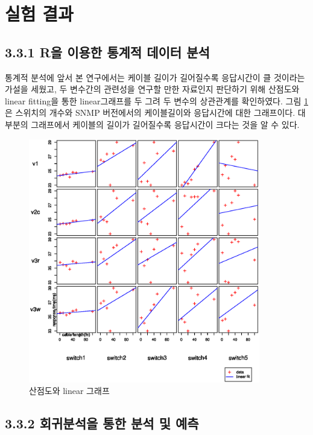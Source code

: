 \documentclass[11pt
  , a4paper
  , article
  , oneside
]{memoir}
\begin{document}
\clearpage
\section{실험 결과}
\subsection{3.3.1 R을 이용한 통계적 데이터 분석}

통계적 분석에 앞서 본 연구에서는 케이블 길이가 길어질수록 응답시간이 클 것이라는 가설을 세웠고, 두 변수간의 관련성을 연구할 만한 자료인지 판단하기 위해 산점도와 linear fitting을 통한 linear그래프를 두 그려 두 변수의 상관관계를 확인하였다. 그림 \ref{fig:linear}은 스위치의 개수와 SNMP 버전에서의 케이블길이와 응답시간에 대한 그래프이다. 대부분의 그래프에서 케이블의 길이가 길어질수록 응답시간이 크다는 것을 알 수 있다.

\begin{figure}[!htb]
  \centering
  \includegraphics[width=0.9\textwidth]{./images/sleep1_switch.eps}
  \caption{산점도와 linear 그래프}
  \label{fig:linear}   
\end{figure}

\clearpage

\subsection{3.3.2 회귀분석을 통한 분석 및 예측}
\end{document}
